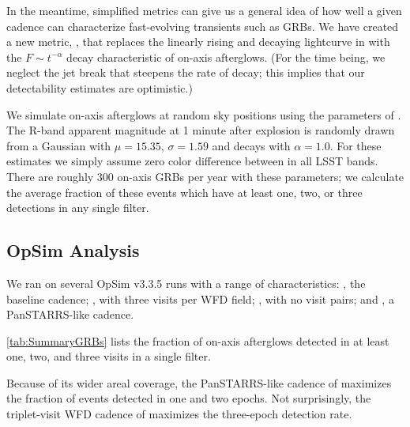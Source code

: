 In the meantime, simplified metrics can give us a general idea of how well
a given cadence can characterize fast-evolving transients such as GRBs.  We
have created a new metric, , that replaces the
linearly rising and decaying lightcurve in  with
the $F \sim t^{-\alpha}$ decay characteristic of on-axis afterglows.  (For
the time being, we neglect the jet break that steepens the rate of decay;
this implies that our detectability estimates are optimistic.)

We simulate on-axis afterglows at random sky positions using the parameters of
\citet{2011PASP..123.1034J}. The R-band apparent magnitude at 1 minute
after explosion is randomly drawn from a Gaussian with $\mu=15.35$,
$\sigma=1.59$ and decays with $\alpha=1.0$.  For these estimates we
simply assume zero color difference between in all LSST bands.
There are roughly 300 on-axis GRBs per year with these parameters;
we calculate the average fraction of these events which have at least one,
two, or three detections in any single filter.



\subsection{OpSim Analysis}
\label{sec:\secname:analysis}

We ran  on several OpSim v3.3.5 runs with a range of
characteristics:  , the baseline cadence;
, with three visits per WFD field;
, with no visit pairs; and
, a PanSTARRS-like cadence.

\autoref{tab:SummaryGRBs} lists the fraction of on-axis afterglows
detected in at least one, two, and three visits in a single filter.

Because of its wider areal coverage, the PanSTARRS-like cadence of
 maximizes the fraction of events detected in
one and two epochs.  Not surprisingly, the triplet-visit WFD cadence of
 maximizes the three-epoch detection
rate.


